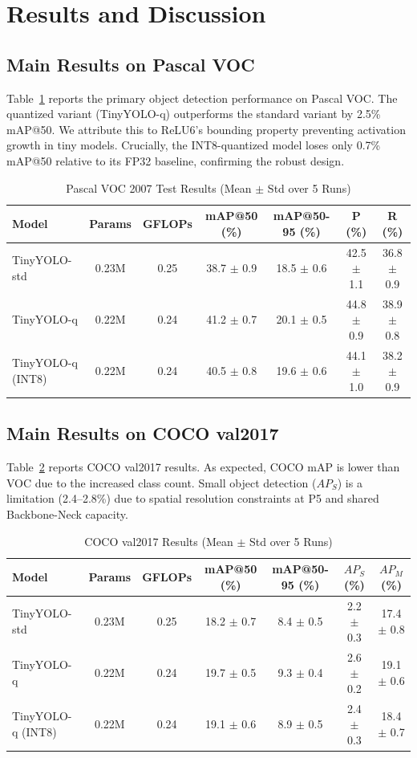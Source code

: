 \documentclass[journal]{IEEEtran}
\begin{document}
\section{Results and Discussion}

\subsection{Main Results on Pascal VOC}
Table~\ref{tab:voc_results} reports the primary object detection performance on Pascal VOC. The quantized variant (TinyYOLO-q) outperforms the standard variant by 2.5\% mAP@50. We attribute this to ReLU6's bounding property preventing activation growth in tiny models. Crucially, the INT8-quantized model loses only 0.7\% mAP@50 relative to its FP32 baseline, confirming the robust design.

\begin{table}[t]
\centering
\caption{Pascal VOC 2007 Test Results (Mean $\pm$ Std over 5 Runs)}
\label{tab:voc_results}
\begin{tabular}{lcccccc}
\toprule
Model & Params & GFLOPs & mAP@50 (\%) & mAP@50-95 (\%) & P (\%) & R (\%) \\
\midrule
TinyYOLO-std & 0.23M & 0.25 & 38.7 $\pm$ 0.9 & 18.5 $\pm$ 0.6 & 42.5 $\pm$ 1.1 & 36.8 $\pm$ 0.9 \\
TinyYOLO-q & 0.22M & 0.24 & 41.2 $\pm$ 0.7 & 20.1 $\pm$ 0.5 & 44.8 $\pm$ 0.9 & 38.9 $\pm$ 0.8 \\
TinyYOLO-q (INT8) & 0.22M & 0.24 & 40.5 $\pm$ 0.8 & 19.6 $\pm$ 0.6 & 44.1 $\pm$ 1.0 & 38.2 $\pm$ 0.9 \\
\bottomrule
\end{tabular}
\end{table}

\subsection{Main Results on COCO val2017}
Table~\ref{tab:coco_results} reports COCO val2017 results. As expected, COCO mAP is lower than VOC due to the increased class count. Small object detection ($AP_S$) is a limitation (2.4--2.8\%) due to spatial resolution constraints at P5 and shared Backbone-Neck capacity.

\begin{table}[t]
\centering
\caption{COCO val2017 Results (Mean $\pm$ Std over 5 Runs)}
\label{tab:coco_results}
\begin{tabular}{lcccccc}
\toprule
Model & Params & GFLOPs & mAP@50 (\%) & mAP@50-95 (\%) & $AP_S$ (\%) & $AP_M$ (\%) \\
\midrule
TinyYOLO-std & 0.23M & 0.25 & 18.2 $\pm$ 0.7 & 8.4 $\pm$ 0.5 & 2.2 $\pm$ 0.3 & 17.4 $\pm$ 0.8 \\
TinyYOLO-q & 0.22M & 0.24 & 19.7 $\pm$ 0.5 & 9.3 $\pm$ 0.4 & 2.6 $\pm$ 0.2 & 19.1 $\pm$ 0.6 \\
TinyYOLO-q (INT8) & 0.22M & 0.24 & 19.1 $\pm$ 0.6 & 8.9 $\pm$ 0.5 & 2.4 $\pm$ 0.3 & 18.4 $\pm$ 0.7 \\
\bottomrule
\end{tabular}
\end{table}
\end{document}
